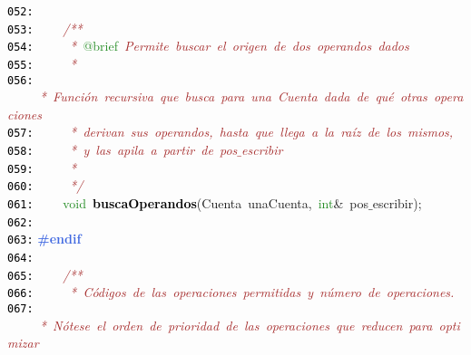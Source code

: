 \documentclass[a4paper,10pt]{scrartcl}
\begin{document}
{   \mbox{}\texttt{\textcolor{Black}{052:}} \ \  \\
   \mbox{}\texttt{\textcolor{Black}{053:}} \ \ \ \ \textit{\textcolor{Brown}{/**}} \\
   \mbox{}\texttt{\textcolor{Black}{054:}} \textit{\textcolor{Brown}{\ \ \ \ \ *\ }}\textcolor{ForestGreen}{@brief}\textit{\textcolor{Brown}{\ Permite\ buscar\ el\ origen\ de\ dos\ operandos\ dados}} \\
   \mbox{}\texttt{\textcolor{Black}{055:}} \textit{\textcolor{Brown}{\ \ \ \ \ *\ }} \\
   \mbox{}\texttt{\textcolor{Black}{056:}} \textit{\textcolor{Brown}{\ \ \ \ \ *\ Función\ recursiva\ que\ busca\ para\ una\ Cuenta\ dada\ de\ qué\ otras\ operaciones}} \\
   \mbox{}\texttt{\textcolor{Black}{057:}} \textit{\textcolor{Brown}{\ \ \ \ \ *\ derivan\ sus\ operandos,\ hasta\ que\ llega\ a\ la\ raíz\ de\ los\ mismos,\ }} \\
   \mbox{}\texttt{\textcolor{Black}{058:}} \textit{\textcolor{Brown}{\ \ \ \ \ *\ y\ las\ apila\ a\ partir\ de\ pos$\_$escribir\ }} \\
   \mbox{}\texttt{\textcolor{Black}{059:}} \textit{\textcolor{Brown}{\ \ \ \ \ *\ }} \\
   \mbox{}\texttt{\textcolor{Black}{060:}} \textit{\textcolor{Brown}{\ \ \ \ \ */}} \\
   \mbox{}\texttt{\textcolor{Black}{061:}} \ \ \ \ \textcolor{ForestGreen}{void}\ \textbf{\textcolor{Black}{buscaOperandos}}\textcolor{BrickRed}{(}\textcolor{TealBlue}{Cuenta}\ unaCuenta\textcolor{BrickRed}{,}\ \textcolor{ForestGreen}{int}\textcolor{BrickRed}{\&}\ pos$\_$escribir\textcolor{BrickRed}{);} \\
   \mbox{}\texttt{\textcolor{Black}{062:}} \ \  \\
   \mbox{}\texttt{\textcolor{Black}{063:}} \textbf{\textcolor{RoyalBlue}{\#endif}} \\
   \mbox{}\texttt{\textcolor{Black}{064:}} \ \  \\
   \mbox{}\texttt{\textcolor{Black}{065:}} \ \ \ \ \textit{\textcolor{Brown}{/**}} \\
   \mbox{}\texttt{\textcolor{Black}{066:}} \textit{\textcolor{Brown}{\ \ \ \ \ *\ Códigos\ de\ las\ operaciones\ permitidas\ y\ número\ de\ operaciones.}} \\
   \mbox{}\texttt{\textcolor{Black}{067:}} \textit{\textcolor{Brown}{\ \ \ \ \ *\ Nótese\ el\ orden\ de\ prioridad\ de\ las\ operaciones\ que\ reducen\ para\ optimizar}} \\
}
\end{document}
